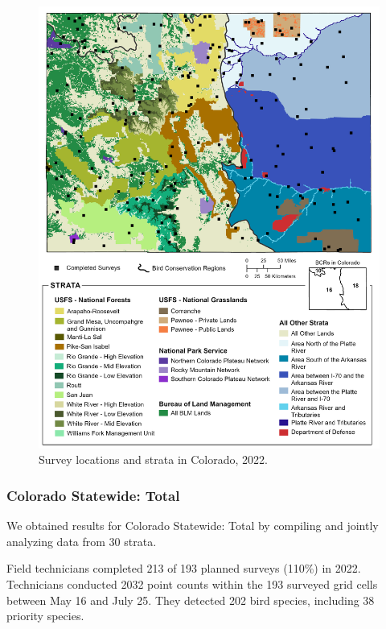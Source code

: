 \documentclass[
  letterpaper,
  DIV=11,
  numbers=noendperiod,
  oneside]{scrreprt}
\begin{document}
\begin{figure}

{\centering \includegraphics{./CO_Report_2022.png}

}

\caption{\label{fig-co}Survey locations and strata in Colorado, 2022.}

\end{figure}

\hypertarget{colorado-statewide-total}{%
\subsubsection{Colorado Statewide:
Total}\label{colorado-statewide-total}}

We obtained results for Colorado Statewide: Total by compiling and
jointly analyzing data from 30 strata.

Field technicians completed 213 of 193 planned surveys (110\%) in 2022.
Technicians conducted 2032 point counts within the 193 surveyed grid
cells between May 16 and July 25. They detected 202 bird species,
including 38 priority species.
\end{document}

